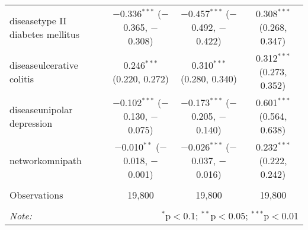 \begin{table}[!htbp]
\begin{tabular}{@{\extracolsep{5pt}}lccc}
  diseasetype II diabetes mellitus & $-$0.336$^{***}$ ($-$0.365, $-$0.308) & $-$0.457$^{***}$ ($-$0.492, $-$0.422) & 0.308$^{***}$ (0.268, 0.347) \\ 
  diseaseulcerative colitis & 0.246$^{***}$ (0.220, 0.272) & 0.310$^{***}$ (0.280, 0.340) & 0.312$^{***}$ (0.273, 0.352) \\ 
  diseaseunipolar depression & $-$0.102$^{***}$ ($-$0.130, $-$0.075) & $-$0.173$^{***}$ ($-$0.205, $-$0.140) & 0.601$^{***}$ (0.564, 0.638) \\ 
  networkomnipath & $-$0.010$^{**}$ ($-$0.018, $-$0.001) & $-$0.026$^{***}$ ($-$0.037, $-$0.016) & 0.232$^{***}$ (0.222, 0.242) \\ 
 \hline \\[-1.8ex] 
Observations & 19,800 & 19,800 & 19,800 \\ 
\hline 
\hline \\[-1.8ex] 
\textit{Note:}  & \multicolumn{3}{r}{$^{*}$p$<$0.1; $^{**}$p$<$0.05; $^{***}$p$<$0.01} \\ 
\end{tabular} 
\end{table} 
